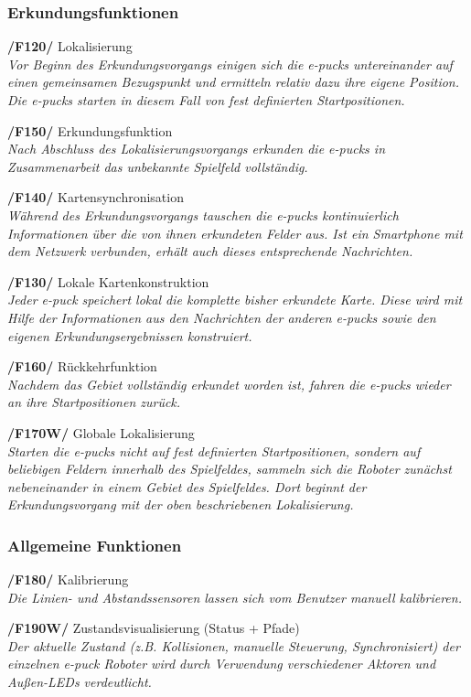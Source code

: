 \documentclass[10pt,a4paper]{article}
\begin{document}
			\subsubsection{Erkundungsfunktionen}
				\begin{list}{}{\leftmargin=1cm}
					\item[\textbf{/F120/}] Lokalisierung
						\\ \textsl{Vor Beginn des Erkundungsvorgangs einigen sich die e-pucks untereinander auf einen gemeinsamen Bezugspunkt
						und ermitteln relativ dazu ihre eigene Position. Die e-pucks starten in diesem Fall von fest definierten Startpositionen.}
					\item[\textbf{/F150/}] Erkundungsfunktion
						\\ \textsl{Nach Abschluss des Lokalisierungsvorgangs erkunden die e-pucks in Zusammenarbeit das unbekannte
							Spielfeld vollständig.}
					\item[\textbf{/F140/}] Kartensynchronisation
						\\ \textsl{Während des Erkundungsvorgangs tauschen die e-pucks kontinuierlich Informationen über die von ihnen
						erkundeten Felder aus. Ist ein Smartphone mit dem Netzwerk verbunden, erhält auch dieses entsprechende Nachrichten.}
					\item[\textbf{/F130/}] Lokale Kartenkonstruktion	
						\\ \textsl{Jeder e-puck speichert lokal die komplette bisher erkundete Karte. Diese wird mit Hilfe
						der Informationen aus den Nachrichten der anderen e-pucks sowie den eigenen Erkundungsergebnissen konstruiert.} 				
					\item[\textbf{/F160/}] Rückkehrfunktion
						\\ \textsl{Nachdem das Gebiet vollständig erkundet worden ist, fahren die e-pucks wieder an ihre Startpositionen
						zurück.}
					\item[\textbf{/F170W/}] Globale Lokalisierung
						\\ \textsl{Starten die e-pucks nicht auf fest definierten Startpositionen, sondern auf beliebigen Feldern innerhalb
							des Spielfeldes, sammeln sich die Roboter zunächst nebeneinander in einem Gebiet des Spielfeldes. Dort beginnt der
							Erkundungsvorgang mit der oben beschriebenen Lokalisierung.}
				\end{list}
		\subsubsection{Allgemeine Funktionen}
			\begin{list}{}{\leftmargin=1cm}
				\item[\textbf{/F180/}] Kalibrierung
					\\ \textsl{Die Linien- und Abstandssensoren lassen sich vom Benutzer manuell kalibrieren.}					
				\item[\textbf{/F190W/}] Zustandsvisualisierung (Status + Pfade)		
					\\ \textsl{Der aktuelle Zustand (z.B. Kollisionen, manuelle Steuerung, Synchronisiert) der einzelnen e-puck Roboter wird
						durch Verwendung verschiedener Aktoren und Außen-LEDs verdeutlicht.}		
			\end{list}
\end{document}
